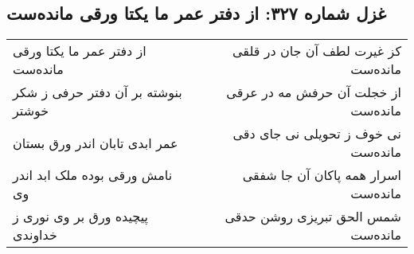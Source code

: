 \begin{center}
\section*{غزل شماره ۳۲۷: از دفتر عمر ما یکتا ورقی مانده‌ست}
\label{sec:0327}
\begin{longtable}{l p{0.5cm} r}
از دفتر عمر ما یکتا ورقی مانده‌ست
&&
کز غیرت لطف آن جان در قلقی مانده‌ست
\\
بنوشته بر آن دفتر حرفی ز شکر خوشتر
&&
از خجلت آن حرفش مه در عرقی مانده‌ست
\\
عمر ابدی تابان اندر ورق بستان
&&
نی خوف ز تحویلی نی جای دقی مانده‌ست
\\
نامش ورقی بوده ملک ابد اندر وی
&&
اسرار همه پاکان آن جا شفقی مانده‌ست
\\
پیچیده ورق بر وی نوری ز خداوندی
&&
شمس الحق تبریزی روشن حدقی مانده‌ست
\\
\end{longtable}
\end{center}

